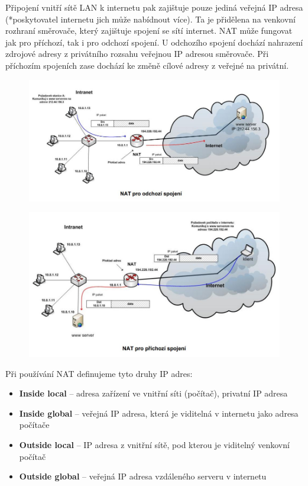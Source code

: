 Připojení vnitří sítě LAN k internetu pak zajištuje pouze jediná veřejná IP adresa (*poskytovatel internetu jich může nabídnout více).
Ta je přidělena na venkovní rozhraní směrovače, který zajištuje spojení se sítí internet. NAT může fungovat jak pro příchozí, tak i pro odchozí spojení.
U odchozího spojení dochází nahrazení zdrojové adresy z privátního rozsahu veřejnou IP adresou směrovače. Při příchozím spojeních zase dochází ke změně cílové adresy z veřejné na privátní.
\begin{figure}[H]
\centering
\includegraphics[width=1\textwidth]{assets/6_nat_out}
\end{figure}

\begin{figure}[H]
\centering
\includegraphics[width=1\textwidth]{assets/6_nat_in}
\end{figure}

Při používání NAT definujeme tyto druhy IP adres:
\begin{itemize}
\item \textbf{Inside local} -- adresa zařízení ve vnitřní síti (počítač), privatní IP adresa
\item \textbf{Inside global} -- veřejná IP adresa, která je viditelná v internetu jako adresa počítače
\item \textbf{Outside local} -- IP adresa z vnitřní sítě, pod kterou je viditelný venkovní počítač
\item \textbf{Outside global} -- veřejná IP adresa vzdáleného serveru v internetu
\end{itemize}

